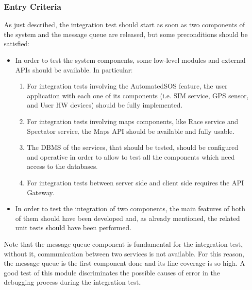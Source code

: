 \subsubsection{Entry Criteria}
As just described, the integration test should start as soon as two components of the system and the message queue are released, but some preconditions should be satisfied:
\begin{itemize}
\item In order to test the system components, some low-level modules and external APIs should be available. In particular: 
\begin{enumerate}
\item For integration tests involving the AutomatedSOS feature, the user application with each one of its components (i.e. SIM service, GPS sensor, and User HW devices) should be fully implemented.
\item For integration tests involving maps components, like Race service and Spectator service, the Maps API should be available and fully usable.
\item The DBMS of the services, that should be tested, should be configured and operative in order to allow to test all the components which need access to the databases.
\item For integration tests between server side and client side requires the API Gateway.
\end{enumerate}
\item In order to test the integration of two components, the main features of both of them should have been developed and, as already mentioned, the related unit tests should have been performed.
\end{itemize}
Note that the message queue component is fundamental for the integration test, without it, communication between two services is not available. For this reason, the message queue is the first component done and its line coverage is so high. A good test of this module discriminates the possible causes of error in the debugging process during the integration test.  
